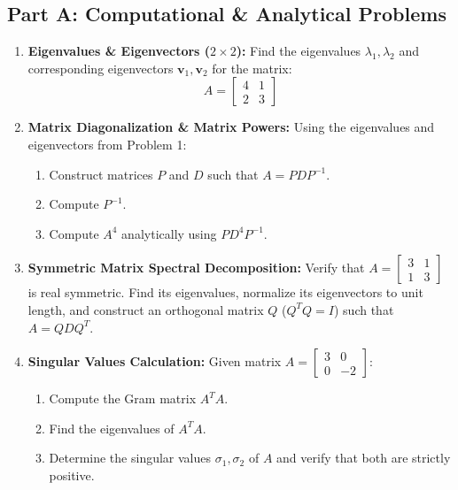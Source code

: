 \subsection*{Part A: Computational \& Analytical Problems}
\begin{enumerate}
\item \textbf{Eigenvalues \& Eigenvectors ($2 \times 2$):} Find the eigenvalues $\lambda_1, \lambda_2$ and corresponding eigenvectors $\mathbf{v}_1, \mathbf{v}_2$ for the matrix:
\begin{equation*}
A = \begin{bmatrix} 4 & 1 \\ 2 & 3 \end{bmatrix}
\end{equation*}

\item \textbf{Matrix Diagonalization \& Matrix Powers:} Using the eigenvalues and eigenvectors from Problem 1:
\begin{enumerate}
    \item Construct matrices $P$ and $D$ such that $A = P D P^{-1}$.
    \item Compute $P^{-1}$.
    \item Compute $A^4$ analytically using $P D^4 P^{-1}$.
\end{enumerate}

\item \textbf{Symmetric Matrix Spectral Decomposition:} Verify that $A = \begin{bmatrix} 3 & 1 \\ 1 & 3 \end{bmatrix}$ is real symmetric. Find its eigenvalues, normalize its eigenvectors to unit length, and construct an orthogonal matrix $Q$ ($Q^T Q = I$) such that $A = Q D Q^T$.

\item \textbf{Singular Values Calculation:} Given matrix $A = \begin{bmatrix} 3 & 0 \\ 0 & -2 \end{bmatrix}$:
\begin{enumerate}
    \item Compute the Gram matrix $A^T A$.
    \item Find the eigenvalues of $A^T A$.
    \item Determine the singular values $\sigma_1, \sigma_2$ of $A$ and verify that both are strictly positive.
\end{enumerate}


\end{enumerate}
